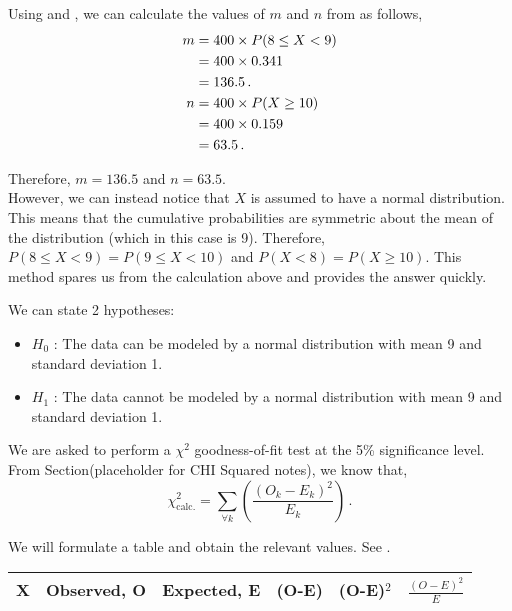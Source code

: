 \begin{subquestions}
\begin{subsubquestions}
Using  and , we can calculate the values of $m$ and $n$ from  as follows,
\begin{align}
	m & = 400 \times P(8 \leq X < 9) \nonumber \\
	  & = 400 \times 0.341 \nonumber \\
	  & = 136.5 \,. \\
    n & = 400 \times P(X \geq 10) \nonumber \\
      & = 400 \times 0.159 \nonumber \\
      & = 63.5 \,.
\end{align}

Therefore, $m=136.5$ and $n=63.5$. \\

However, we can instead notice that $X$ is assumed to have a normal distribution. This means that the cumulative probabilities are symmetric about the mean of the distribution (which in this case is 9). Therefore, $P(8 \leq X < 9) = P(9 \leq X < 10)$ and $P(X < 8) = P(X \geq 10)$. This method spares us from the calculation above and provides the answer quickly.


\subsubquestion

We can state 2 hypotheses:
\begin{itemize}
	\item $H_0$ : The data can be modeled by a normal distribution with mean 9 and standard deviation 1.
	\item $H_1$ : The data cannot be modeled by a normal distribution with mean 9 and standard deviation 1.
\end{itemize}

We are asked to perform a $\chi^2$ goodness-of-fit test at the 5\% significance level. From Section(placeholder for CHI Squared notes), we know that,
\begin{equation}
	\chi^2_{\text{calc.}} = \sum_{\forall k} \left( \frac{(O_k-E_k)^2}{E_k}\right) \,.
\end{equation}

We will formulate a table and obtain the relevant values. See .
\begin{table}[ht]
	\centering
	\begin{tabular}{|c|c|c|c|c|c|}
		\hline 
		X & Observed, O & Expected, E & (O-E) & (O-E)$^2$ & $\frac{(O-E)^2}{E}$ \\
		\hline
		

\end{tabular}
\end{table}
\end{subsubquestions}
\end{subquestions}
